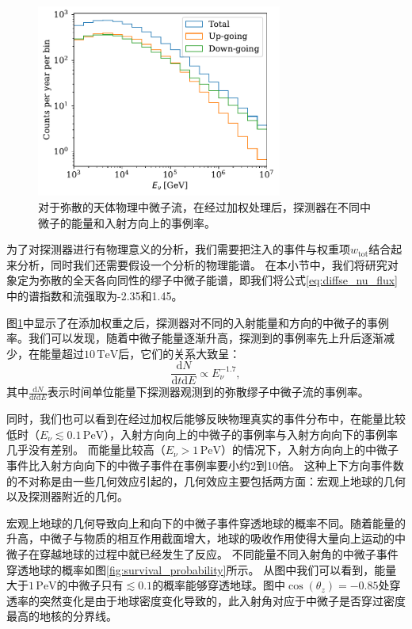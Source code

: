 \begin{figure}[!ht]%
    \centering
    \includegraphics[width=0.72\textwidth]{img/sampling_energy_spectrum.pdf}
    \caption{对于弥散的天体物理中微子流，在经过加权处理后，探测器在不同中微子的能量和入射方向上的事例率。}
    \label{fig:sampling_energy_spectrum}
\end{figure}

为了对探测器进行有物理意义的分析，我们需要把注入的事件与权重项$w_\mathrm{tot}$结合起来分析，同时我们还需要假设一个分析的物理能谱。
在本小节中，我们将研究对象定为弥散的全天各向同性的缪子中微子能谱，即我们将公式\ref{eq:diffse_nu_flux}中的谱指数和流强取为-2.35和1.45\cite{IceCube_diffse_muon:2021}。

图\ref{fig:sampling_energy_spectrum}中显示了在添加权重之后，探测器对不同的入射能量和方向的中微子的事例率。我们可以发现，随着中微子能量逐渐升高，探测到的事例率先上升后逐渐减少，在能量超过$10\,\mathrm{TeV}$后，它们的关系大致呈：
\begin{equation}
    \frac{\mathrm{d}N}{\mathrm{d}t\mathrm{d}E} \propto E_\nu^{-1.7}, 
    \label{eq:diffse_nu_mu_flux_observed}
\end{equation}
其中$\frac{\mathrm{d}N}{\mathrm{d}t\mathrm{d}E}$表示时间单位能量下探测器观测到的弥散缪子中微子流的事例率。


同时，我们也可以看到在经过加权后能够反映物理真实的事件分布中，在能量比较低时（$E_\nu \lesssim 0.1\,\mathrm{PeV}$），入射方向向上的中微子的事例率与入射方向向下的事例率几乎没有差别。
而能量比较高（$E_\nu > 1\,\mathrm{PeV}$）的情况下，入射方向向上的中微子事件比入射方向向下的中微子事件在事例率要小约2到10倍。
这种上下方向事件数的不对称是由一些几何效应引起的，几何效应主要包括两方面：宏观上地球的几何以及探测器附近的几何。

宏观上地球的几何导致向上和向下的中微子事件穿透地球的概率不同。随着能量的升高，中微子与物质的相互作用截面增大，地球的吸收作用使得大量向上运动的中微子在穿越地球的过程中就已经发生了反应。
不同能量不同入射角的中微子事件穿透地球的概率如图\ref{fig:survival_probability}所示。
从图中我们可以看到，能量大于$1\,\mathrm{PeV}$的中微子只有$\lesssim 0.1$的概率能够穿透地球。图中$\cos(\theta_z)=-0.85$处穿透率的突然变化是由于地球密度变化导致的，此入射角对应于中微子是否穿过密度最高的地核的分界线。


